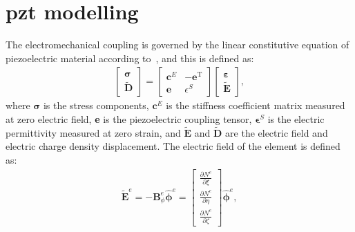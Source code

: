 \section{\Acs{pzt} modelling}
\label{sec:PZTmodel}

The electromechanical coupling is governed by the linear constitutive equation of piezoelectric material according to~\cite{giurgiutiu2009micromechatronics, rekatsinas2017cubic}, and this is defined as:
\begin{eqnarray}
	\left [ 
	\begin {array}{c}
	\boldsymbol{\sigma}\\
	\widetilde{\textbf{D}}
\end{array}\right ]=
\left [ 
\begin{array}{cc}
	\textbf{c}^E & -\textbf{e}^{\mathrm{T}} \\
	\textbf{e} & \epsilon^S 
\end{array} \right ]
\left[ 
\begin{array}{c}
	\boldsymbol{\varepsilon}\\
	\widetilde{\textbf{E}} 
\end{array} \right ],
\label{eq:elecmechcoupling}
\end{eqnarray}
%
%
%
%
where \(\boldsymbol{\sigma}\) is the stress components, \(\textbf{c}^E\) is the stiffness coefficient matrix measured at zero electric field, \textbf{e} is the piezoelectric coupling tensor, \(\boldsymbol{\epsilon}^S\) is the electric permittivity measured at zero strain, and \(\widetilde{\textbf{E}}\) and \(\widetilde{\textbf{D}}\) are the electric field and electric charge density displacement.
The electric field of the element is defined as:
\begin{eqnarray}
\widetilde{\textbf{E}}^e=-\textbf{B}_\phi^e \widehat{\boldsymbol{\phi}}^e = \left[ \begin{array}{c}
	\frac{\partial N^e}{\partial \xi}\\
	\frac{\partial N^e}{\partial \eta}\\
	\frac{\partial N^e}{\partial \zeta}
\end{array} \right] \widehat{\boldsymbol{\phi}}^e,
\end{eqnarray}
